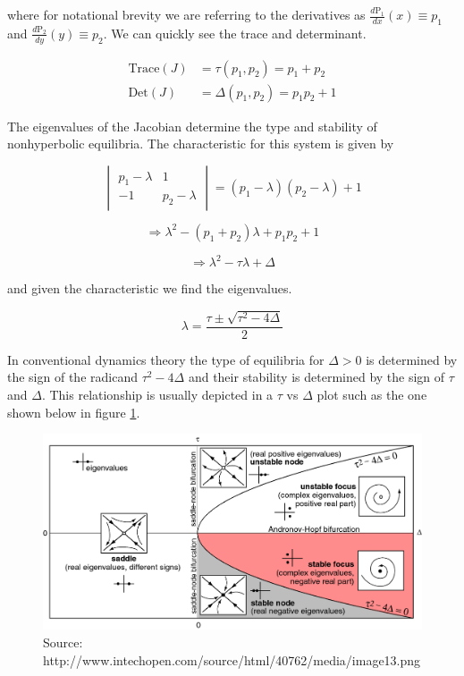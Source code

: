 \documentclass{article}
\begin{document}
\noindent where for notational brevity we are referring to the derivatives as
$\frac{d\text{P}_1}{dx}(x) \equiv p_1$ and $\frac{d\text{P}_2}{dy}(y) \equiv p_2$.
We can quickly see the trace and determinant.

\begin{align}
    \text{Trace}(J) &= \tau(p_1,p_2) = p_1 + p_2 \label{eq:trace} \\ 
    \text{Det}(J) &= \Delta(p_1,p_2) = p_1 p_2 +1 \label{eq:det}
\end{align}

\noindent The eigenvalues of the Jacobian determine the type and stability of
nonhyperbolic equilibria. The characteristic for this system is given by

\begin{equation*}
    \begin{vmatrix}
        p_1-\lambda & 1 \\
        -1 & p_2-\lambda
    \end{vmatrix} = (p_1-\lambda)(p_2-\lambda)+1 
\end{equation*}

\begin{equation*}
    \Rightarrow \lambda^2 - (p_1+p_2)\lambda + p_1 p_2 +1
\end{equation*}

\begin{equation}
    \Rightarrow \lambda^2-\tau \lambda+\Delta \label{eq:characteristic}
\end{equation}

\noindent and given the characteristic we find the eigenvalues.

\[\lambda = \frac{\tau \pm \sqrt{\tau^2-4\Delta}}{2}\]

\noindent In conventional dynamics theory the type of equilibria for $\Delta>0$ is determined by
the sign of the radicand $\tau^2-4\Delta$ and their stability is
determined by the sign of $\tau$ and $\Delta$. This relationship is usually
depicted in a $\tau$ vs $\Delta$ plot such as the one shown below in figure
\ref{fig:tauvsdelta}.

\begin{figure}[h]
\centering
\includegraphics[scale=0.37]{figures/tauvsdelta.png}
\caption{Source: http://www.intechopen.com/source/html/40762/media/image13.png}
\label{fig:tauvsdelta}
\end{figure}
\end{document}
